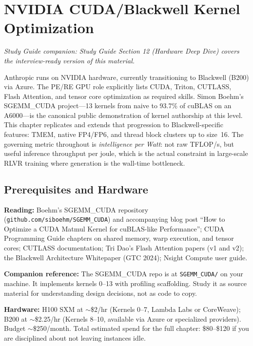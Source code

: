 \section{NVIDIA CUDA/Blackwell Kernel Optimization}

\smallskip\noindent\textit{Study Guide companion: Study Guide Section 12 (Hardware Deep Dive) covers the interview-ready version of this material.}
\smallskip

\begin{whythis}
Anthropic runs on NVIDIA hardware, currently transitioning to Blackwell (B200) via Azure. The PE/RE GPU role explicitly lists CUDA, Triton, CUTLASS, Flash Attention, and tensor core optimization as required skills. Simon Boehm's SGEMM\_CUDA project---13 kernels from naive to 93.7\% of cuBLAS on an A6000---is the canonical public demonstration of kernel authorship at this level. This chapter replicates and extends that progression to Blackwell-specific features: TMEM, native FP4/FP6, and thread block clusters up to size~16. The governing metric throughout is \textit{intelligence per Watt}: not raw TFLOP/s, but useful inference throughput per joule, which is the actual constraint in large-scale RLVR training where generation is the wall-time bottleneck.
\end{whythis}

\subsection{Prerequisites and Hardware}

\textbf{Reading:} Boehm's SGEMM\_CUDA repository (\texttt{github.com/siboehm/SGEMM\_CUDA}) and accompanying blog post ``How to Optimize a CUDA Matmul Kernel for cuBLAS-like Performance''; CUDA Programming Guide chapters on shared memory, warp execution, and tensor cores; CUTLASS documentation; Tri Dao's Flash Attention papers (v1 and v2); the Blackwell Architecture Whitepaper (GTC 2024); Nsight Compute user guide.

\textbf{Companion reference:} The SGEMM\_CUDA repo is at \texttt{SGEMM\_CUDA/} on your machine. It implements kernels 0--13 with profiling scaffolding. Study it as source material for understanding design decisions, not as code to copy.

\textbf{Hardware:} H100 SXM at $\sim$\$2/hr (Kernels 0--7, Lambda Labs or CoreWeave); B200 at $\sim$\$2.25/hr (Kernels 8--10, available via Azure or specialized providers). Budget $\sim$\$250/month. Total estimated spend for the full chapter: \$80--\$120 if you are disciplined about not leaving instances idle.

